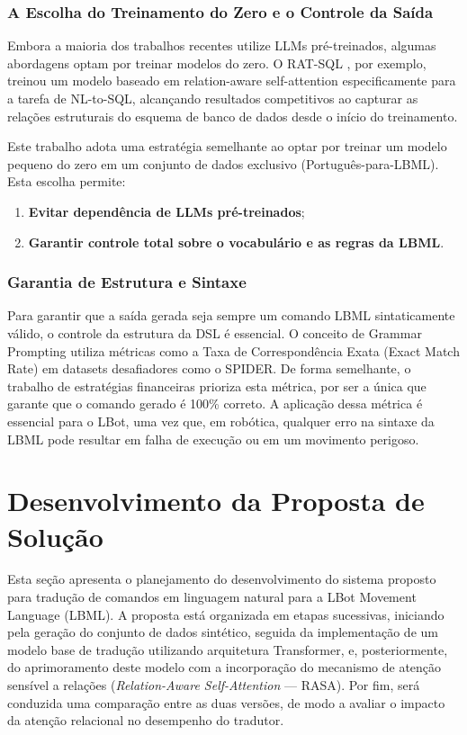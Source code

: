 \documentclass[12pt]{article}
\begin{document}
\subsubsection{A Escolha do Treinamento do Zero e o Controle da Saída}

Embora a maioria dos trabalhos recentes utilize LLMs pré-treinados, algumas abordagens optam por treinar modelos do zero. O RAT-SQL \citep{Wang2021}, por exemplo, treinou um modelo baseado em relation-aware self-attention especificamente para a tarefa de NL-to-SQL, alcançando resultados competitivos ao capturar as relações estruturais do esquema de banco de dados desde o início do treinamento.

Este trabalho adota uma estratégia semelhante ao optar por treinar um modelo pequeno do zero em um conjunto de dados exclusivo (Português-para-LBML). Esta escolha permite:

\begin{enumerate}
\item \textbf{Evitar dependência de LLMs pré-treinados};
\item \textbf{Garantir controle total sobre o vocabulário e as regras da LBML}.
\end{enumerate}

\subsubsection{Garantia de Estrutura e Sintaxe}

Para garantir que a saída gerada seja sempre um comando LBML sintaticamente válido, o controle da estrutura da DSL é essencial. O conceito de Grammar Prompting \citep{Wang2023} utiliza métricas como a Taxa de Correspondência Exata (Exact Match Rate) em datasets desafiadores como o SPIDER. De forma semelhante, o trabalho de estratégias financeiras \citep{Wu2025} prioriza esta métrica, por ser a única que garante que o comando gerado é 100\% correto. A aplicação dessa métrica é essencial para o LBot, uma vez que, em robótica, qualquer erro na sintaxe da LBML pode resultar em falha de execução ou em um movimento perigoso.

\section{Desenvolvimento da Proposta de Solução}

Esta seção apresenta o planejamento do desenvolvimento do sistema proposto para tradução de comandos em linguagem natural para a LBot Movement Language (LBML). A proposta está organizada em etapas sucessivas, iniciando pela geração do conjunto de dados sintético, seguida da implementação de um modelo base de tradução utilizando arquitetura Transformer, e, posteriormente, do aprimoramento deste modelo com a incorporação do mecanismo de atenção sensível a relações (\textit{Relation-Aware Self-Attention} — RASA). Por fim, será conduzida uma comparação entre as duas versões, de modo a avaliar o impacto da atenção relacional no desempenho do tradutor.
\end{document}
